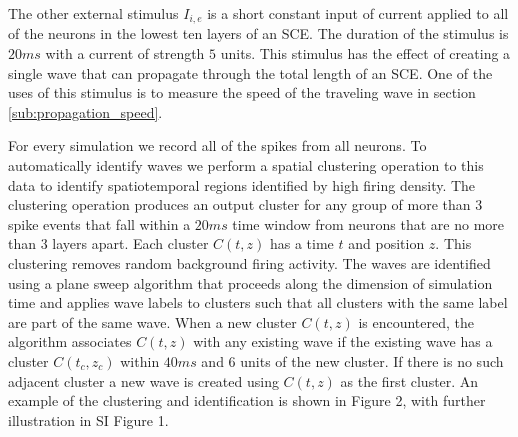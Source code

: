 \documentclass[12pt]{article}
\begin{document}
The other external stimulus $I_{i,e}$ is a short constant input of current applied to all of the neurons in the lowest ten layers of an SCE. 
The duration of the stimulus is $20 ms$ with a current of strength $5$ units. 
This stimulus has the effect of creating a single wave that can propagate through the total length of an SCE.
One of the uses of this stimulus is to measure the speed of the traveling wave in section \ref{sub:propagation_speed}.

For every simulation we record all of the spikes from all neurons. 
To automatically identify waves we perform a spatial clustering operation to this data to identify spatiotemporal regions identified by high firing density. 
The clustering operation produces an output cluster for any group of more than $3$ spike events that fall within a $20ms$ time window from neurons that are no more than $3$ layers apart.
Each cluster $C(t,z)$ has a time $t$ and position $z$.
This clustering removes random background firing activity. 
The waves are identified using a plane sweep algorithm that proceeds along the dimension of simulation time and applies wave labels to clusters such that all clusters with the same label are part of the same wave.
When a new cluster $C(t,z)$ is encountered, the algorithm associates $C(t,z)$ with any existing wave if the existing wave has a cluster $C(t_c,z_c)$ within $40 ms$ and $6$ units of the new cluster.
If there is no such adjacent cluster a new wave is created using $C(t,z)$ as the first cluster.
\color{red}
An example of the clustering and identification is shown in Figure 2, with further illustration in SI Figure 1.
\color{black}
\end{document}

